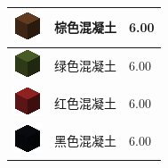 \documentclass[UTF8]{ctexart}
\begin{document}
\begin{longtable}[]{|p{1cm}|p{8cm}|p{1.5cm}|}
	\hline
	\includegraphics{.workspace/icons/minecraft/minecraft__concrete__12.png} & 棕色混凝土 &6.00\\
	\hline
	\includegraphics{.workspace/icons/minecraft/minecraft__concrete__13.png} & 绿色混凝土 &6.00\\
	\hline
	\includegraphics{.workspace/icons/minecraft/minecraft__concrete__14.png} & 红色混凝土 &6.00\\
	\hline
	\includegraphics{.workspace/icons/minecraft/minecraft__concrete__15.png} & 黑色混凝土 &6.00\\
	\hline

\end{longtable}
\end{document}
